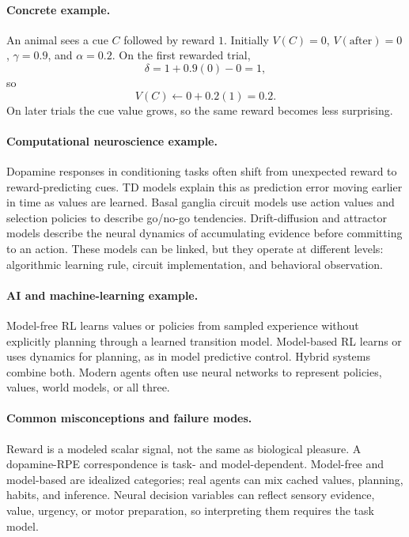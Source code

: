 \paragraph{Concrete example.}
An animal sees a cue \(C\) followed by reward \(1\). Initially \(V(C)=0\), \(V(\mathrm{after})=0\), \(\gamma=0.9\), and \(\alpha=0.2\). On the first rewarded trial,
\[
\delta=1+0.9(0)-0=1,
\]
so
\[
V(C)\leftarrow0+0.2(1)=0.2.
\]
On later trials the cue value grows, so the same reward becomes less surprising.

\paragraph{Computational neuroscience example.}
Dopamine responses in conditioning tasks often shift from unexpected reward to reward-predicting cues. TD models explain this as prediction error moving earlier in time as values are learned. Basal ganglia circuit models use action values and selection policies to describe go/no-go tendencies. Drift-diffusion and attractor models describe the neural dynamics of accumulating evidence before committing to an action. These models can be linked, but they operate at different levels: algorithmic learning rule, circuit implementation, and behavioral observation.

\paragraph{AI and machine-learning example.}
Model-free RL learns values or policies from sampled experience without explicitly planning through a learned transition model. Model-based RL learns or uses dynamics for planning, as in model predictive control. Hybrid systems combine both. Modern agents often use neural networks to represent policies, values, world models, or all three.

\paragraph{Common misconceptions and failure modes.}
Reward is a modeled scalar signal, not the same as biological pleasure. A dopamine-RPE correspondence is task- and model-dependent. Model-free and model-based are idealized categories; real agents can mix cached values, planning, habits, and inference. Neural decision variables can reflect sensory evidence, value, urgency, or motor preparation, so interpreting them requires the task model.

